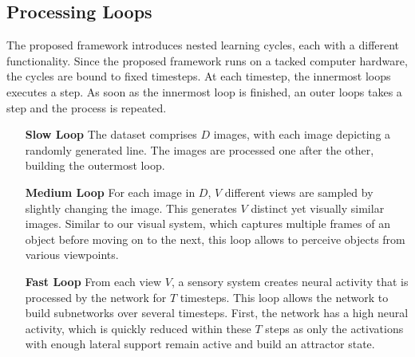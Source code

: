 \subsection{Processing Loops}
The proposed framework introduces nested learning cycles, each with a different functionality. Since the proposed framework runs on a tacked computer hardware, the cycles are bound to fixed timesteps. At each timestep, the innermost loops executes a step. As soon as the innermost loop is finished, an outer loops takes a step and the process is repeated.

\begin{itemize}
\item[\textbf{Slow Loop}] The dataset comprises $D$ images, with each image depicting a randomly generated line. The images are processed one after the other, building the outermost loop.
\item[\textbf{Medium Loop}] For each image in $D$, $V$ different views are sampled by slightly changing the image. This generates $V$ distinct yet visually similar images. Similar to our visual system, which captures multiple frames of an object before moving on to the next, this loop allows to perceive objects from various viewpoints.
\item[\textbf{Fast Loop}] From each view $V$, a sensory system creates neural activity that is processed by the network for $T$ timesteps. This loop allows the network to build subnetworks over several timesteps. First, the network has a high neural activity, which is quickly reduced within these $T$ steps as only the activations with enough lateral support remain active and build an attractor state.
\end{itemize}



